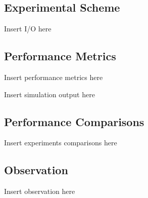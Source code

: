 \documentclass[conference]{IEEEtran}
\begin{document}
\subsection{Experimental Scheme}

Insert I/O here


\subsection{Performance Metrics}

Insert performance metrics here


Insert simulation output here


\subsection{Performance Comparisons}

Insert experiments comparisons here


\subsection{Observation}

Insert observation here


\end{document}
